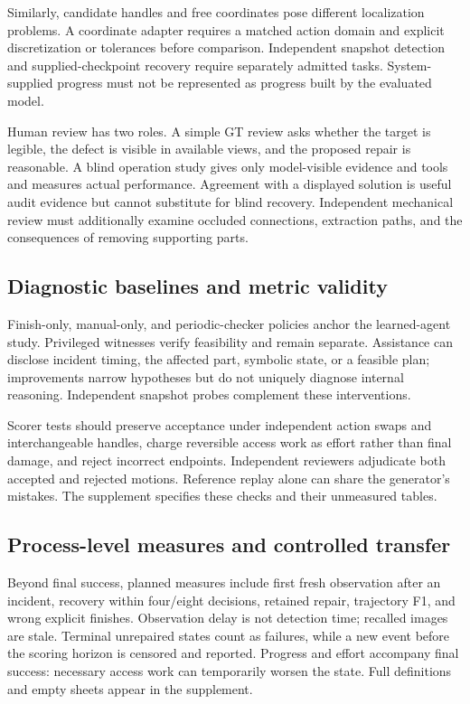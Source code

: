 \documentclass[10pt,twocolumn,letterpaper]{article}
\begin{document}
Similarly, candidate handles and free coordinates pose different localization problems. A coordinate adapter requires a matched action domain and explicit discretization or tolerances before comparison. Independent snapshot detection and supplied-checkpoint recovery require separately admitted tasks. System-supplied progress must not be represented as progress built by the evaluated model.

Human review has two roles. A simple GT review asks whether the target is legible, the defect is visible in available views, and the proposed repair is reasonable. A blind operation study gives only model-visible evidence and tools and measures actual performance. Agreement with a displayed solution is useful audit evidence but cannot substitute for blind recovery. Independent mechanical review must additionally examine occluded connections, extraction paths, and the consequences of removing supporting parts.

\subsection{Diagnostic baselines and metric validity}
Finish-only, manual-only, and periodic-checker policies anchor the learned-agent study. Privileged witnesses verify feasibility and remain separate. Assistance can disclose incident timing, the affected part, symbolic state, or a feasible plan; improvements narrow hypotheses but do not uniquely diagnose internal reasoning. Independent snapshot probes complement these interventions.

Scorer tests should preserve acceptance under independent action swaps and interchangeable handles, charge reversible access work as effort rather than final damage, and reject incorrect endpoints. Independent reviewers adjudicate both accepted and rejected motions. Reference replay alone can share the generator's mistakes. The supplement specifies these checks and their unmeasured tables.

\subsection{Process-level measures and controlled transfer}
Beyond final success, planned measures include first fresh observation after an incident, recovery within four/eight decisions, retained repair, trajectory F1, and wrong explicit finishes. Observation delay is not detection time; recalled images are stale. Terminal unrepaired states count as failures, while a new event before the scoring horizon is censored and reported. Progress and effort accompany final success: necessary access work can temporarily worsen the state. Full definitions and empty sheets appear in the supplement.
\end{document}
